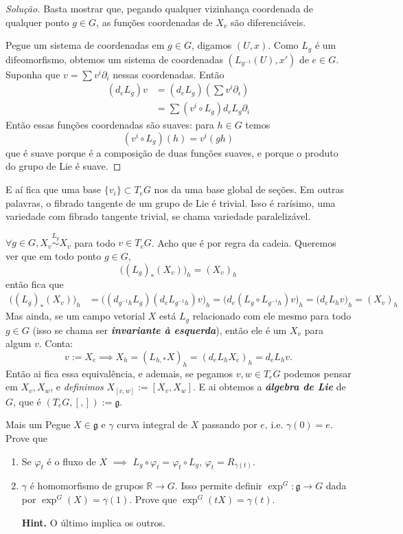 \begin{proof}[Solução]\leavevmode
Basta mostrar que, pegando qualquer vizinhança coordenada de qualquer ponto \(g \in G\), as funções coordenadas de \(X_v\) são diferenciáveis.

Pegue um sistema de coordenadas em  \(g \in G\), digamos \((U,x)\). Como  \(L_g\) é um difeomorfismo, obtemos um sistema de coordenadas \((L_{g^{-1}}(U),x')\) de \(e \in G\). Suponha que \(v=\sum v^i\partial_i\) nessas coordenadas. Então
\begin{align*}
	(d_eL_g)v&=(d_eL_g)\left(\sum v^i\partial_i\right) \\
	&=\sum (v^i \circ L_g)d_eL_g\partial_i
\end{align*}
Então essas funções coordenadas são suaves: para \(h \in G\) temos
\[(v^i \circ L_g)(h)=v^i(gh)\]
que é suave porque é a composição de duas funções suaves, e porque o produto do grupo de Lie é suave.
\end{proof}
E aí fica que uma base \(\{v_i\}\subset T_eG\) nos da uma base global de seções. Em outras palavras, o fibrado tangente de um grupo de Lie é trivial. Isso é rarísimo, uma variedade com fibrado tangente trivial, se chama variedade paralelizável.

\begin{remark}\leavevmode
\(\forall g \in G, X_v \overset{L_g}{\sim}X_v\) para todo \(v \in T_eG\). Acho que é por regra da cadeia. Queremos ver
que em todo ponto \(g \in G\), \[\Big((L_g)_*(X_v)\Big)_h=(X_v)_h\]
então fica que
\begin{align*}
\Big((L_g)_*(X_v)\Big)_h&=\Big((d_{g^{-1}h}L_g)(d_eL_{g^{-1}h})v\Big)_h=\Big(d_e(L_g\circ L_{g^{-1}h})v\Big)_h=\Big(d_eL_{h}v\Big)_h=(X_v)_h
\end{align*}
Mas ainda, se um campo vetorial \(X\) está \(L_g\) relacionado com ele mesmo para todo \(g \in G\) (isso se chama ser \textit{\textbf{invariante à esquerda}}), então ele é um \(X_v\) para algum \(v\). Conta:
\[v:=X_e \implies X_h=(L_{h,*}X)_h=(d_eL_{h}X_e)_h=d_eL_hv.\]
Então ai fica essa equivalência, e ademais, se pegamos \(v,w \in T_eG\) podemos pensar em \(X_v,X_w\), e \textit{definimos} \(X_{[v,w]}:=[X_v,X_w]\). E ai obtemos a \textit{\textbf{álgebra de Lie}} de \(G\), que é \((T_eG,[,]):=\mathfrak{g}\).
\end{remark}

\begin{thing6}{Mais um}\leavevmode
Pegue \(X \in \mathfrak{g}\) e \(\gamma\) curva integral de \(X\) passando por \(e\), i.e. \(\gamma(0)=e\). Prove que
\begin{enumerate}
\item Se \(\varphi_t\) é o fluxo de \(X\) \(\implies\) \(L_g \circ\varphi_t = \varphi_t\circ L_g\), \(\varphi_t = R_{\gamma(t)}\).
\item \(\gamma\) é homomorfismo de grupos \(\mathbb{R} \to G\). Isso permite definir \(\operatorname{exp}^G: \mathfrak{g} \to G\) dada por \(\operatorname{exp}^G(X)=\gamma(1)\). Prove que \(\operatorname{exp}^G(tX)=\gamma(t)\).

\textbf{Hint.} O último implica os outros.
\end{enumerate}
\end{thing6}

